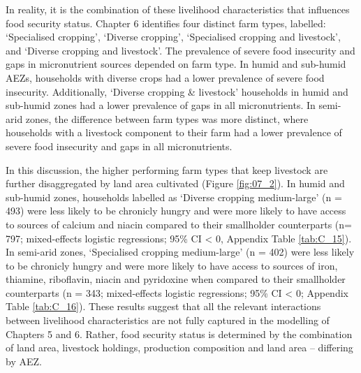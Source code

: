 In reality, it is the combination of these livelihood characteristics that influences food security status. Chapter 6 identifies four distinct farm types, labelled: `Specialised cropping', `Diverse cropping', `Specialised cropping and livestock', and `Diverse cropping and livestock'. The prevalence of severe food insecurity and gaps in micronutrient sources depended on farm type. In humid and sub-humid AEZs, households with diverse crops had a lower prevalence of severe food insecurity. Additionally, `Diverse cropping \& livestock' households in humid and sub-humid zones had a lower prevalence of gaps in all micronutrients. In semi-arid zones, the difference between farm types was more distinct, where households with a livestock component to their farm had a lower prevalence of severe food insecurity and gaps in all micronutrients.

In this discussion, the higher performing farm types that keep livestock are further disaggregated by land area cultivated (Figure \ref{fig:07_2}). In humid and sub-humid zones, households labelled as `Diverse cropping medium-large' (n = 493) were less likely to be chronicly hungry and were more likely to have access to sources of calcium and niacin compared to their smallholder counterparts (n= 797; mixed-effects logistic regressions; 95\% CI < 0, Appendix Table \ref{tab:C_15}). In semi-arid zones, `Specialised cropping medium-large' (n = 402) were less likely to be chronicly hungry and were more likely to have access to sources of iron, thiamine, riboflavin, niacin and pyridoxine when compared to their smallholder counterparts (n = 343; mixed-effects logistic regressions; 95\% CI < 0; Appendix Table \ref{tab:C_16}). These results suggest that all the relevant interactions between livelihood characteristics are not fully captured in the modelling of Chapters 5 and 6. Rather, food security status is determined by the combination of land area, livestock holdings, production composition and land area -- differing by AEZ.


